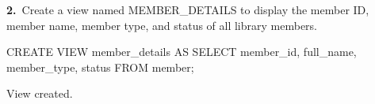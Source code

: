 \noindent\begin{minipage}{\linewidth}
\begingroup{}
{\fontsize{14}{17}\selectfont\textbf{2.}}\ Create a view named MEMBER\_DETAILS to display the member ID, member name, member type, and status of all library members.\par
\endgroup\vspace{12pt}


\begin{sqlcode}
CREATE VIEW member_details AS
SELECT member_id, full_name, member_type, status
FROM member;
\end{sqlcode}

\vspace{18pt}


\begin{sqlout}[fontsize=\small]
View created.
\end{sqlout}
\end{minipage}\par\vspace{24pt}

